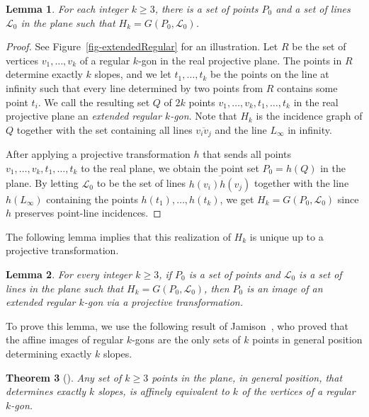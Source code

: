\documentclass{article}
\newtheorem{theorem}{Theorem}
\newtheorem{lemma}[theorem]{Lemma}
\begin{document}
\begin{lemma}
\label{lem-realization}
For each integer $k \geq 3$, there is a set of points $P_0$ and a set of lines~$\mathcal{L}_0$ in the plane such that $H_k= G(P_0,\mathcal{L}_0)$.
\end{lemma}
\begin{proof}
See Figure~\ref{fig-extendedRegular} for an illustration.
Let $R$ be the set of vertices $v_1,\dots,v_k$ of a regular $k$-gon in the real projective plane.
The points in $R$ determine exactly $k$ slopes, and we let $t_1,\dots,t_k$ be the points on the line at infinity such that every line determined by two points from $R$ contains some point $t_i$.
We call the resulting set $Q$ of $2k$ points $v_1,\dots,v_k,t_1,\dots,t_k$ in the real projective plane an \emph{extended regular $k$-gon}.
Note that $H_k$ is the incidence graph of $Q$ together with the set containing all lines $\overline{v_iv_j}$ and the line $L_{\infty}$ in infinity.

After applying a projective transformation $h$ that sends all points $v_1,\dots,v_k,\allowbreak t_1,\dots,t_k$ to the real plane, we obtain the point set $P_0 = h(Q)$ in the plane. 
By letting $\mathcal{L}_0$ to be the set of lines $\overline{h(v_i)h(v_j)}$ together with the line $h(L_\infty)$ containing the points $h(t_1),\dots,h(t_k)$, we get $H_k = G(P_0,\mathcal{L}_0)$ since $h$ preserves point-line incidences.
\end{proof}

The following lemma implies that this realization of $H_k$ is unique up to a projective transformation.

\begin{lemma}
\label{lem-realizationUnique}
For every integer $k \geq 3$, if $P_0$ is a set of points and $\mathcal{L}_0$ is a set of lines in the plane such that $H_k=G(P_0,\mathcal{L}_0)$, then $P_0$ is an image of an extended regular $k$-gon via a projective transformation.
\end{lemma}

To prove this lemma, we use the following result of Jamison~\cite{jamison86}, who proved that the affine images of regular $k$-gons are the only sets of $k$ points in general position determining exactly $k$ slopes.

\begin{theorem}[\cite{jamison86}]
\label{thm-directions}
Any set of $k \geq 3$ points in the plane, in general position, that determines
exactly $k$ slopes, is affinely equivalent to $k$ of the vertices of a regular $k$-gon.
\end{theorem}
\end{document}
